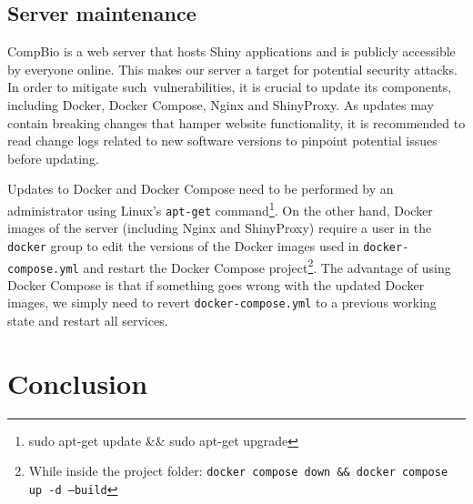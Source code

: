 \subsection{Server maintenance}


CompBio is a web server that hosts Shiny applications and is publicly accessible by everyone online. This makes our server a target for potential security attacks. In order to mitigate such vulnerabilities, it is crucial to update its components, including Docker, Docker Compose, Nginx and ShinyProxy. As updates may contain breaking changes that hamper website functionality, it is recommended to read change logs related to new software versions to pinpoint potential issues before updating.


Updates to Docker and Docker Compose need to be performed by an administrator using Linux's \texttt{apt-get} command\footnote{sudo apt-get update \&\& sudo apt-get upgrade}. On the other hand, Docker images of the server (including Nginx and ShinyProxy) require a user in the \texttt{docker} group to edit the versions of the Docker images used in \texttt{docker-compose.yml} and restart the Docker Compose project\footnote{While inside the project folder: \texttt{docker compose down \&\& docker compose up -d --build}}. The advantage of using Docker Compose is that if something goes wrong with the updated Docker images, we simply need to revert \texttt{docker-compose.yml} to a previous working state and restart all services.

\section{Conclusion}



